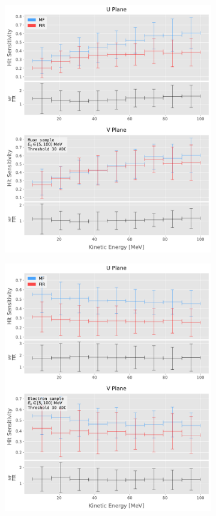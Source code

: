 \begin{figure}[t]
	\begin{subfigure}{0.5\textwidth}
		\centering
		\includegraphics[width=.99\linewidth]{Images/Matched_Filter/hit_study_muon_sensitivity_30}
	\end{subfigure}
	\begin{subfigure}{0.5\textwidth}
		\centering
		\includegraphics[width=.99\linewidth]{Images/Matched_Filter/hit_study_electron_sensitivity_30}

\end{subfigure}
\end{figure}
